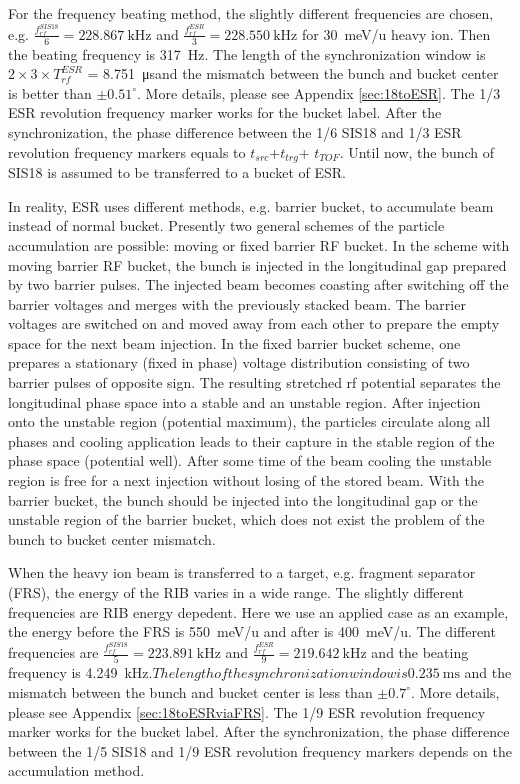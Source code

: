 For the frequency beating method, the slightly different frequencies are chosen, e.g. $\frac{f_{rf}^{SIS18}}{6}=\SI{228.867}{\kHz}$ and $\frac{f_{rf}^{ESR}}{3}=\SI{228.550}{\kHz}$ for \SI{30}{meV/\atomicmassunit} heavy ion. Then the beating frequency is \SI{317}{\Hz}. The length of the synchronization window is $2\times 3\times T_{rf}^{ESR}$ = \SI{8.751}{\us}and the mismatch between the bunch and bucket center is better than $\pm0.51^\circ$. More details, please see Appendix \ref{sec:18toESR}. The 1/3 ESR revolution frequency marker works for the bucket label. After the synchronization, the phase difference between the 1/6 SIS18 and 1/3 ESR revolution frequency markers equals to $t_{src}$+$t_{trg}$+ $t_{TOF}$. Until now, the bunch of SIS18 is assumed to be transferred to a bucket of ESR. 

In reality, ESR uses different methods, e.g. barrier bucket, to accumulate beam instead of normal bucket.  Presently two general schemes of the particle accumulation are possible: moving or fixed barrier RF bucket. In the scheme with moving barrier RF bucket, the bunch is injected in the longitudinal gap prepared by two barrier pulses. The injected beam becomes coasting after switching off the barrier voltages and merges with
the previously stacked beam. The barrier voltages are switched on and moved away from each other to prepare the empty space for the next beam injection. In the fixed barrier bucket scheme, one prepares a stationary (fixed in phase) voltage distribution consisting of two barrier pulses of opposite sign. The resulting stretched rf potential separates the longitudinal phase space into a stable and an unstable region. After injection
onto the unstable region (potential maximum), the particles circulate along all phases and cooling application leads to their capture in the stable region of the phase space (potential well). After some time of the beam cooling the unstable region is free for a next injection without losing of the stored beam. With the barrier bucket, the bunch should be injected into the longitudinal gap or the unstable region of the barrier bucket, which does not exist the problem of the bunch to bucket center mismatch.

When the heavy ion beam is transferred to a target, e.g. fragment separator (FRS), the energy of the RIB varies in a wide range. The slightly different frequencies are RIB energy depedent. Here we use an applied case as an example, the energy before the FRS is \SI{550}{meV/\atomicmassunit} and after is \SI{400}{meV/\atomicmassunit}. The different frequencies are   $\frac{f_{rf}^{SIS18}}{5}=\SI{223.891}{\kHz}$ and $\frac{f_{rf}^{ESR}}{9}=\SI{219.642}{\kHz}$ and the beating frequency is \SI{4.249}{\kHz}$. The length of the synchronization window is \SI{0.235}{\ms}$ and the mismatch between the bunch and bucket center is less than $\pm0.7^\circ$. More details, please see Appendix \ref{sec:18toESRviaFRS}. The 1/9 ESR revolution frequency marker works for the bucket label. After the synchronization, the phase difference between the 1/5 SIS18 and 1/9 ESR revolution frequency markers depends on the accumulation method. 

